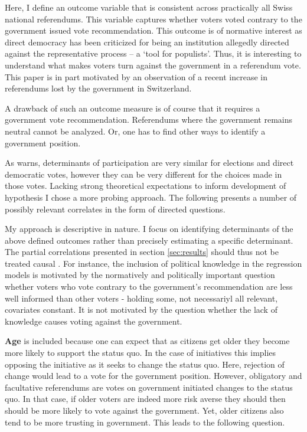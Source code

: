 \documentclass[11pt,a4paper]{article}\usepackage[]{graphicx}\usepackage[]{color}
\begin{document}
    Here, I define an outcome variable that is consistent across practically all Swiss national referendums. This variable captures whether voters voted contrary to the government issued vote recommendation. This outcome is of normative interest as direct democracy has been criticized for being an institution allegedly directed against the representative process -- a `tool for populists'. Thus, it is interesting to understand what makes voters turn against the government in a referendum vote. This paper is in part motivated by an observation of a recent increase in referendums lost by the government in Switzerland.
    
    A drawback of such an outcome measure is of course that it requires a government vote recommendation. Referendums where the government remains neutral cannot be analyzed. Or, one has to find other ways to identify a government position.
    
    As \citet{schoen_wahlen_2012} warns, determinants of participation are very similar for elections and direct democratic votes, however they can be very different for the choices made in those votes. Lacking strong theoretical expectations to inform development of hypothesis I chose a more probing approach. The following presents a number of possibly relevant correlates in the form of directed questions.
    
    My approach is descriptive in nature. I focus on identifying determinants of the above defined outcomes rather than precisely estimating a specific determinant. The partial correlations presented in section \ref{sec:results} should thus not be treated causal \citep{keele_perils_2014}. For instance, the inclusion of political knowledge in the regression models is motivated by the normatively and politically important question whether voters who vote contrary to the government's recommendation are less well informed than other voters - holding some, not necessariyl all relevant, covariates constant. It is not motivated by the question whether the lack of knowledge causes voting against the government.
    
    
    \textbf{Age} is included because one can expect that as citizens get older they become more likely to support the status quo. In the case of initiatives this implies opposing the initiative as it seeks to change the status quo. Here, rejection of change would lead to a vote for the government position. However, obligatory and facultative referendums are votes on government initiated changes to the status quo. In that case, if older voters are indeed more risk averse they should then should be more likely to vote against the government. Yet, older citizens also tend to be more trusting in government. This leads to the following question.
    
\end{document}
